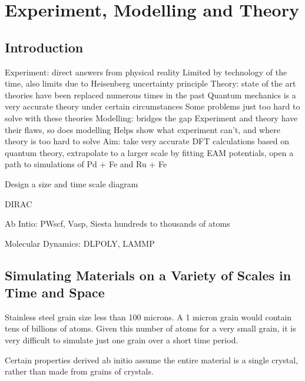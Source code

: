 
\section{Experiment, Modelling and Theory}

\subsection{Introduction}


Experiment: direct answers from physical reality
Limited by technology of the time, also limits due to Heisenberg uncertainty principle
Theory: state of the art theories have been replaced numerous times in the past
Quantum mechanics is a very accurate theory under certain circumstances
Some problems just too hard to solve with these theories
Modelling: bridges the gap
Experiment and theory have their flaws, so does modelling
Helps show what experiment can’t, and where theory is too hard to solve
Aim: take very accurate DFT calculations based on quantum theory, extrapolate to a larger scale by fitting EAM potentials, open a path to simulations of Pd + Fe and Ru + Fe

Design a size and time scale diagram





DIRAC 



Ab Intio:  PWscf, Vasp, Siesta 
hundreds to thousands of atoms

Molecular Dynamics: DLPOLY, LAMMP










\subsection{Simulating Materials on a Variety of Scales in Time and Space}

Stainless steel grain size less than 100 microns.  A 1 micron grain would contain tens of billions of atoms.  Given this number of atoms for a very small grain, it is very difficult to simulate just one grain over a short time period.

Certain properties derived ab initio assume the entire material is a single crystal, rather than made from grains of crystals.  





